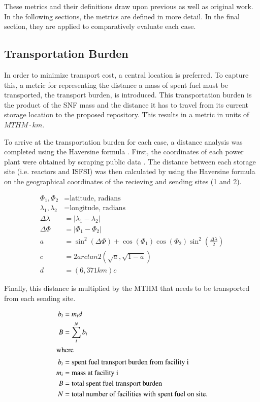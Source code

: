 These metrics and their definitions draw upon previous 
\cite{freeze_siting_2015,ISRG_book_2016} as well as original work.  In the 
following sections, the metrics are defined in more detail. In 
the final section, they are applied to comparatively evaluate each 
case.

\subsection{Transportation Burden}
 In order to minimize transport cost, a central location is preferred. To 
 capture this, a metric 
 for representing the distance a mass of spent fuel must be transported, the 
 transport burden, is introduced. This transportation burden is the product 
 of the \gls{SNF} mass and the distance it has to travel from its current 
 storage location to the proposed repository. This results in a 
 metric in units of $MTHM\cdot km$. 

 To arrive at the transportation burden for each case, a distance analysis was 
 completed using the Haversine formula \cite{shumaker_astronomical_1984}. 
 First, the coordinates of each power plant were obtained by scraping public 
 data \cite{wikipedia}.  The distance between each storage site (i.e. reactors 
 and \gls{ISFSI}) was then calculated by using the Haversine formula on the 
 geographical coordinates of the recieving and sending sites (1 and 2). 

 \begin{align} 
         \Phi_1,\Phi_2&= \mbox{latitude, radians}\\
         \lambda_1,\lambda_2 &= \mbox{longitude, radians}\\
         \Delta\lambda &= \left|\lambda_1 - \lambda_2\right|\\
         \Delta\Phi &= \left|\Phi_1 - \Phi_2\right|\\
         a&=\sin^2(\Delta\Phi)+\cos(\Phi_1)\cos(\Phi_2)\sin^2{\left(\frac{\Delta\lambda}{2}\right)}\\
         c &= 2arctan2(\sqrt{a},\sqrt{1-a})\\
         d &=  (6,371km)c
 \end{align}


Finally, this distance is multiplied by the \gls{MTHM} that needs to be 
transported from each sending site.

\begin{align}
        b_i &= m_id\\
        B &= \sum_i^N b_i\\
        \intertext{where}
        b_i &= \mbox{spent fuel transport burden from facility i}\\
        m_i &= \mbox{mass at facility i}\\
        B &= \mbox{total spent fuel transport burden}\\
        N &= \mbox{total number of facilities with spent fuel on site.}
\end{align}

